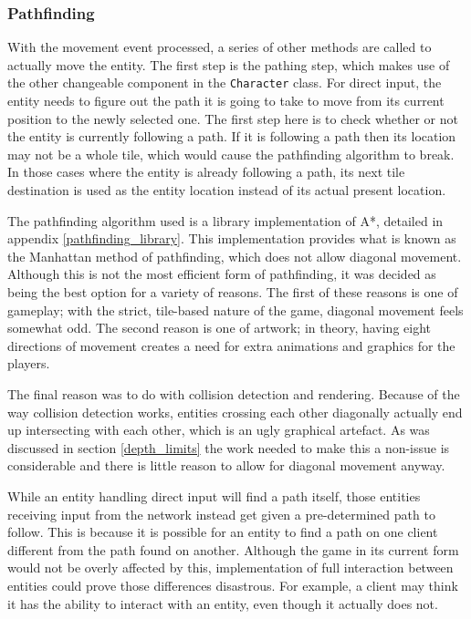 \subsubsection{Pathfinding}
With the movement event processed, a series of other methods are called to actually move the entity. The first step is the pathing step, which makes use of the other changeable component in the \texttt{Character} class. For direct input, the entity needs to figure out the path it is going to take to move from its current position to the newly selected one. The first step here is to check whether or not the entity is currently following a path. If it is following a path then its location may not be a whole tile, which would cause the pathfinding algorithm to break. In those cases where the entity is already following a path, its next tile destination is used as the entity location instead of its actual present location.

The pathfinding algorithm used is a library implementation of A*, detailed in appendix \ref{pathfinding_library}. This implementation provides what is known as the Manhattan method of pathfinding, which does not allow diagonal movement. Although this is not the most efficient form of pathfinding, it was decided as being the best option for a variety of reasons. The first of these reasons is one of gameplay; with the strict, tile-based nature of the game, diagonal movement feels somewhat odd. The second reason is one of artwork; in theory, having eight directions of movement creates a need for extra animations and graphics for the players.


The final reason was to do with collision detection and rendering. Because of the way collision detection works, entities crossing each other diagonally actually end up intersecting with each other, which is an ugly graphical artefact. As was discussed in section \ref{depth_limits} the work needed to make this a non-issue is considerable and there is little reason to allow for diagonal movement anyway.


While an entity handling direct input will find a path itself, those entities receiving input from the network instead get given a pre-determined path to follow. This is because it is possible for an entity to find a path on one client different from the path found on another. Although the game in its current form would not be overly affected by this, implementation of full interaction between entities could prove those differences disastrous. For example, a client may think it has the ability to interact with an entity, even though it actually does not.

